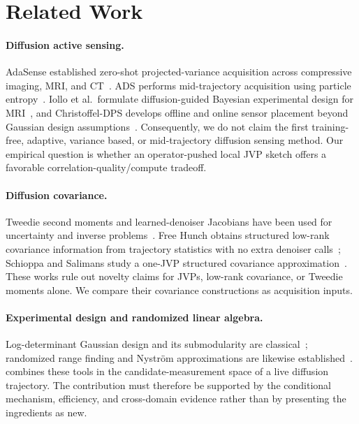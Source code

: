 \section{Related Work}

\paragraph{Diffusion active sensing.}
AdaSense established zero-shot projected-variance acquisition across
compressive imaging, MRI, and CT~\cite{elata2024adasense}.  ADS performs
mid-trajectory acquisition using particle entropy~\cite{nolan2025ads}.
Iollo et al.\ formulate diffusion-guided Bayesian experimental design for
MRI~\cite{iollo2025bedmri}, and Christoffel-DPS develops offline and online
sensor placement beyond Gaussian design assumptions~\cite{christoffel2026dps}.
Consequently, we do not claim the first training-free, adaptive, variance
based, or mid-trajectory diffusion sensing method.  Our empirical question is
whether an operator-pushed local JVP sketch offers a favorable
correlation-quality/compute tradeoff.

\paragraph{Diffusion covariance.}
Tweedie second moments and learned-denoiser Jacobians have been used for
uncertainty and inverse problems~\cite{manor2024posterior,peng2024covariance,
boys2024tmpd}.  Free Hunch obtains structured low-rank covariance information
from trajectory statistics with no extra denoiser
calls~\cite{rissanen2025freehunch}; Schioppa and Salimans study a one-JVP
structured covariance approximation~\cite{schioppa2026covaware}.  These works
rule out novelty claims for JVPs, low-rank covariance, or Tweedie moments
alone.  We compare their covariance constructions as acquisition inputs.

\paragraph{Experimental design and randomized linear algebra.}
Log-determinant Gaussian design and its submodularity are
classical~\cite{krause2005nearoptimal,nemhauser1978analysis}; randomized range
finding and Nystr\"om approximations are likewise
established~\cite{halko2011finding}.  \method{} combines these tools in the
candidate-measurement space of a live diffusion trajectory.  The contribution
must therefore be supported by the conditional mechanism, efficiency, and
cross-domain evidence rather than by presenting the ingredients as new.
